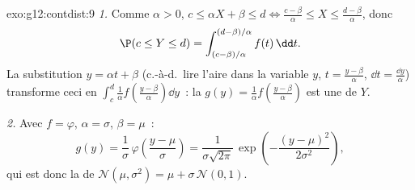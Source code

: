 \begin{solution}{exo:g12:contdist:9}
\emph{1.} Comme $\alpha > 0$, $c \leq \alpha X + \beta \leq d
\iff \frac{c - \beta}{\alpha} \leq X \leq \frac{d - \beta}{\alpha}$, donc
\[
\P(c \leq Y \leq d)
= \int_{(c-\beta)/\alpha}^{(d-\beta)/\alpha} f(t)\,\dd t .
\]
La substitution $y = \alpha t + \beta$ (c.-à-d.\ lire l'aire dans la
variable $y$, $t = \frac{y - \beta}{\alpha}$,
$\dd t = \frac{\dd y}{\alpha}$) transforme ceci en
$\int_c^d \frac{1}{\alpha} f\left(\frac{y-\beta}{\alpha}\right)\dd y$~: la
 $g(y) = \frac1\alpha f\left(\frac{y-\beta}{\alpha}\right)$ est
une  de $Y$.

\emph{2.} Avec $f = \varphi$, $\alpha = \sigma$, $\beta = \mu$~:
\[
g(y) = \frac{1}{\sigma}\,\varphi\!\left(\frac{y - \mu}{\sigma}\right)
= \frac{1}{\sigma\sqrt{2\pi}}\,
\exp\left(-\frac{(y-\mu)^2}{2\sigma^2}\right),
\]
qui est donc la  de
$\mathcal N(\mu, \sigma^2) = \mu + \sigma\,\mathcal N(0,1)$.
\end{solution}

